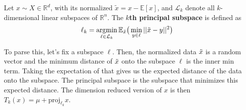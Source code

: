     \begin{definition}
      Let $x \sim X \in \mathbb{R}^d$, with its normalized $\tilde{x} = x - \mathbb{E}[x]$, and $\mathcal{L}_k$ denote all $k$-dimensional linear subspaces of $\mathbb{R}^n$. The \textbf{$k$th principal subspace} is defined as 
      \begin{equation}
        \ell_k = \operatorname*{\arg\!\min}_{\ell \in \mathcal{L}_k} \mathbb{E}_{\Tilde{x}} \big( \min_{y \in \ell} ||\Tilde{x} - y||^2 \big)
      \end{equation}

      To parse this, let's fix a subspace $\ell$. Then, the normalized data $\Tilde{x}$ is a random vector and the minimum distance of $\Tilde{x}$ onto the subspace $\ell$ is the inner min term. Taking the expectation of that gives us the expected distance of the data onto the subspace. The principal subspace is the subspace that minimizes this expected distance. The dimension reduced version of $x$ is then $T_k (x) = \mu + \mathrm{proj}_{\ell_k} x$. 

      \begin{figure}[H]
        \centering
        \begin{subfigure}[b]{0.4\textwidth}
        \centering
\end{subfigure}
\end{figure}
\end{definition}
